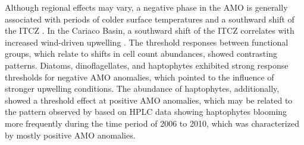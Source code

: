 \documentclass[draft]{agujournal2019}
\begin{document}
    Although regional effects may vary, a negative phase in the AMO is generally associated with periods of colder surface temperatures and a southward shift of the ITCZ \cite{knight_climate_2006, colna2017latitudinal}. In the Cariaco Basin, a southward shift of the ITCZ correlates with increased wind-driven upwelling \cite{taylor_ecosystem_2012}. The threshold responses between functional groups, which relate to shifts in cell count abundances, showed contrasting patterns. Diatoms, dinoflagellates, and haptophytes exhibited strong response thresholds for negative AMO anomalies, which pointed to the influence of stronger upwelling conditions. The abundance of haptophytes, additionally, showed a threshold effect at positive AMO anomalies, which may be related to the pattern observed by  based on HPLC data showing haptophytes blooming more frequently during the time period of 2006 to 2010, which was characterized by mostly positive AMO anomalies.
    
\end{document}
